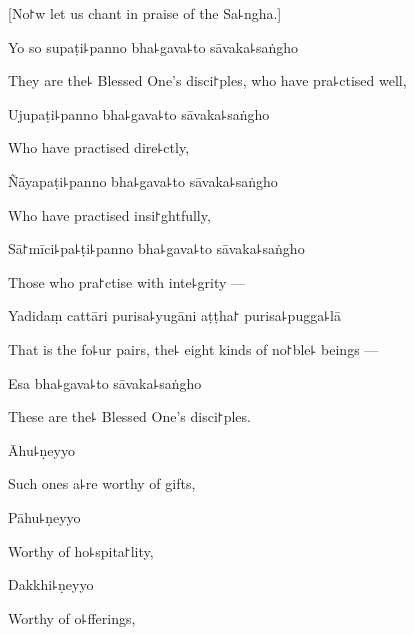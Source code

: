 \begin{english}
  [No꜓w let us chant in praise of the Sa꜕ngha.]
\end{english}

%
Yo so supaṭi꜕panno bha꜕gava꜕to sāvaka꜕saṅgho

\begin{english}
  They are the꜕ Blessed One's disci꜓ples, who have pra꜕ctised well,
\end{english}

Ujupaṭi꜕panno bha꜕gava꜕to sāvaka꜕saṅgho

\begin{english}
  Who have practised dire꜕ctly,
\end{english}

Ñāyapaṭi꜕panno bha꜕gava꜕to sāvaka꜕saṅgho

\begin{english}
  Who have practised insi꜓ghtfully,
\end{english}

Sā꜓mīci꜕pa꜕ṭi꜕panno bha꜕gava꜕to sāvaka꜕saṅgho

\begin{english}
  Those who pra꜓ctise with inte꜕grity ---
\end{english}

Yadidaṃ cattāri purisa꜕yugāni aṭṭha꜓ purisa꜕pugga꜕lā

\begin{english}
  That is the fo꜕ur pairs, the꜕ eight kinds of no꜓ble꜕ beings ---
\end{english}

Esa bha꜕gava꜕to sāvaka꜕saṅgho

\begin{english}
  These are the꜕ Blessed One's disci꜓ples.
\end{english}

Āhu꜕ṇeyyo

\begin{english}
  Such ones a꜕re worthy of gifts,
\end{english}

Pāhu꜕ṇeyyo

\begin{english}
  Worthy of ho꜕spita꜓lity,
\end{english}

\enlargethispage{\baselineskip}

Dakkhi꜕ṇeyyo

\begin{english}
  Worthy of o꜕fferings,
\end{english}


